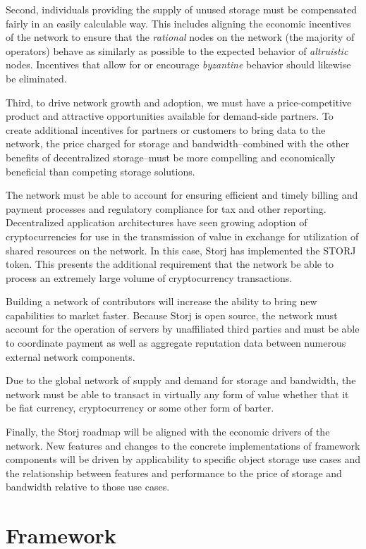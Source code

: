 \documentclass[11pt,fleqn,openany]{book}
\begin{document}
Second, individuals providing the supply of unused storage must
be compensated fairly in an easily calculable way.
This includes aligning the economic incentives of the network to ensure
that the {\em rational} nodes on the network (the majority of operators) behave
as similarly as possible to the expected behavior of {\em altruistic} nodes.
Incentives that allow for or encourage {\em byzantine} behavior should likewise
be eliminated.

Third, to drive network growth and adoption, we must have a price-competitive
product and attractive
opportunities available for demand-side partners. To create additional
incentives for partners or customers to bring data to the network,
the price charged for storage and bandwidth--combined with the other
benefits of decentralized storage--must be
more compelling and economically beneficial than competing storage solutions.

The network must be able to account for ensuring efficient and timely billing
and payment processes and regulatory compliance for tax and other reporting.
Decentralized application architectures have seen growing adoption of
cryptocurrencies for use in the transmission of value in
exchange for utilization of shared resources on the network.
In this case, Storj has implemented the STORJ token.
This presents the additional requirement that the network be able to process
an extremely large volume of cryptocurrency transactions.

Building a network of contributors will increase the ability to bring new
capabilities to market faster.
Because Storj is open source, the network must account for the operation of
servers by unaffiliated third parties and must be able to coordinate payment
as well as aggregate reputation data between numerous external network
components.

Due to the global network of supply and demand for storage and bandwidth, the
network must be able to transact in virtually any form of value whether that it
be fiat currency, cryptocurrency or some other form of barter.

Finally, the Storj roadmap will be aligned with the economic drivers of the
network.
New features and changes to the concrete implementations of framework
components will be driven by applicability to specific object storage use cases
and the relationship between features and performance to the price of storage
and bandwidth relative to those use cases.

\chapter{Framework}\label{chap:framework}
\end{document}
